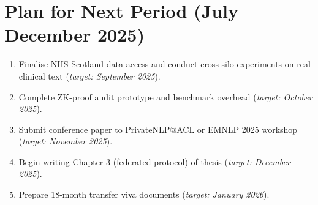 \section{Plan for Next Period (July – December 2025)}

\begin{enumerate}[leftmargin=*, itemsep=1pt, topsep=2pt]
  \item Finalise NHS Scotland data access and conduct cross-silo experiments on real
        clinical text (\textit{target: September 2025}).
  \item Complete ZK-proof audit prototype and benchmark overhead
        (\textit{target: October 2025}).
  \item Submit conference paper to PrivateNLP@ACL or EMNLP 2025 workshop
        (\textit{target: November 2025}).
  \item Begin writing Chapter 3 (federated protocol) of thesis
        (\textit{target: December 2025}).
  \item Prepare 18-month transfer viva documents (\textit{target: January 2026}).
\end{enumerate}

